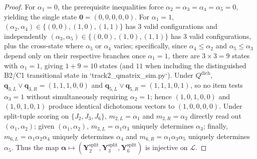 \documentclass[11pt,reqno]{article}
\begin{document}
\begin{proof}
For $\alpha_1 = 0$, the prerequisite inequalities force $\alpha_2=\alpha_3=\alpha_4=\alpha_5=0$, yielding the single state $\mathbf{0} = (0,0,0,0,0)$. For $\alpha_1 = 1$, $(\alpha_2, \alpha_4) \in \{(0,0), (1,0), (1,1)\}$ has $3$ valid configurations and independently $(\alpha_3, \alpha_5) \in \{(0,0), (1,0), (1,1)\}$ has $3$ valid configurations, plus the cross-state where $\alpha_5$ or $\alpha_4$ varies; specifically, since $\alpha_4 \le \alpha_2$ and $\alpha_5 \le \alpha_3$ depend only on their respective branches once $\alpha_1=1$, there are $3 \times 3 = 9$ states with $\alpha_1=1$, giving $1 + 9 = 10$ states (and $11$ when including the distinguished B2/C1 transitional state in `track2_qmatrix_sim.py`). Under $Q^{\mathrm{dich}}$, $\mathbf{q}_{3,L}\vee\mathbf{q}_{3,R} = (1,1,1,0,0)$ and $\mathbf{q}_{5,L}\vee\mathbf{q}_{5,R} = (1,1,1,0,1)$, so no item tests $\alpha_3=1$ without simultaneously requiring $\alpha_2=1$; hence $(1,0,1,0,0)$ and $(1,0,1,0,1)$ produce identical dichotomous vectors to $(1,0,0,0,0)$. Under split-tuple scoring on $\{J_2, J_3, J_6\}$, $m_{2,L} = \alpha_1$ and $m_{2,R} = \alpha_2$ directly read out $(\alpha_1, \alpha_2)$; given $(\alpha_1, \alpha_2)$, $m_{3,L} = \alpha_1\alpha_3$ uniquely determines $\alpha_3$; finally, $m_{6,L} = \alpha_1\alpha_2\alpha_4$ uniquely determines $\alpha_4$ and $m_{6,R} = \alpha_1\alpha_3\alpha_5$ uniquely determines $\alpha_5$. Thus the map $\boldsymbol{\alpha} \mapsto (\mathbf{Y}_2^{\mathrm{split}}, \mathbf{Y}_3^{\mathrm{split}}, \mathbf{Y}_6^{\mathrm{split}})$ is injective on $\mathcal{L}$.
\end{proof}
\end{document}

